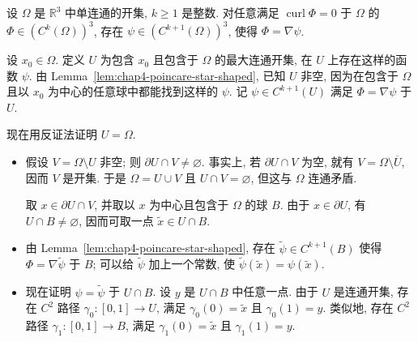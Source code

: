 
\begin{Lemma}
\label{lem:chap4-poincare-simply-connected}
设 $\Omega$ 是 $\mathbb R^3$ 中单连通的开集, $k\geq1$ 是整数. 对任意满足 $\operatorname{curl}\Phi=0$ 于 $\Omega$ 的 $\Phi\in(C^k(\Omega))^3$, 存在 $\psi\in(C^{k+1}(\Omega))^3$, 使得 $\Phi=\nabla\psi$.
\end{Lemma}

\begin{Proof}
设 $x_0\in\Omega$. 定义 $U$ 为包含 $x_0$ 且包含于 $\Omega$ 的最大连通开集, 在 $U$ 上存在这样的函数 $\psi$. 由 Lemma~\ref{lem:chap4-poincare-star-shaped}, 已知 $U$ 非空, 因为在包含于 $\Omega$ 且以 $x_0$ 为中心的任意球中都能找到这样的 $\psi$. 记 $\psi\in C^{k+1}(U)$ 满足 $\Phi=\nabla\psi$ 于 $U$.

现在用反证法证明 $U=\Omega$.
\begin{itemize}
 \item 假设 $V=\Omega\setminus U$ 非空; 则 $\partial U\cap V\neq\varnothing$. 事实上, 若 $\partial U\cap V$ 为空, 就有 $V=\Omega\setminus\overline U$, 因而 $V$ 是开集. 于是 $\Omega=U\cup V$ 且 $U\cap V=\varnothing$, 但这与 $\Omega$ 连通矛盾.

 取 $x\in\partial U\cap V$, 并取以 $x$ 为中心且包含于 $\Omega$ 的球 $B$. 由于 $x\in\partial U$, 有 $U\cap B\neq\varnothing$, 因而可取一点 $\widetilde x\in U\cap B$.

 \item 由 Lemma~\ref{lem:chap4-poincare-star-shaped}, 存在 $\widetilde\psi\in C^{k+1}(B)$ 使得 $\Phi=\nabla\widetilde\psi$ 于 $B$; 可以给 $\widetilde\psi$ 加上一个常数, 使 $\widetilde\psi(\widetilde x)=\psi(\widetilde x)$.

 \item 现在证明 $\psi=\widetilde\psi$ 于 $U\cap B$. 设 $y$ 是 $U\cap B$ 中任意一点. 由于 $U$ 是连通开集, 存在 $C^2$ 路径 $\gamma_0:[0,1]\to U$, 满足 $\gamma_0(0)=\widetilde x$ 且 $\gamma_0(1)=y$. 类似地, 存在 $C^2$ 路径 $\gamma_1:[0,1]\to B$, 满足 $\gamma_1(0)=\widetilde x$ 且 $\gamma_1(1)=y$.


\end{itemize}
\end{Proof}
